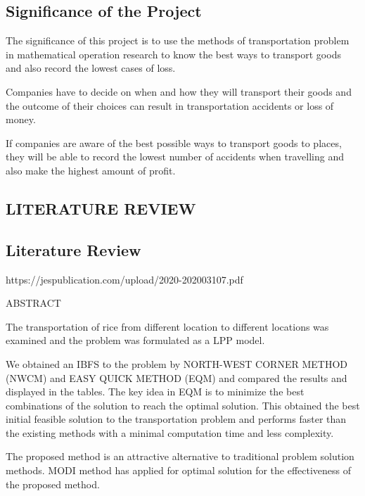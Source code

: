 \documentclass{article}
\begin{document}
\newpage

\begin{center}
\subsection{Significance of the Project}
\end{center}

The significance of this project is to use the methods of transportation problem in mathematical operation research to know the best ways to transport goods and also record the lowest cases of loss.

Companies have to decide on when and how they will transport their goods and the outcome of their choices can result in transportation accidents or loss of money. 

If companies are aware of the best possible ways to transport goods to places, they will be able to record the lowest number of accidents when travelling and also make the highest amount of profit.

\newpage

\begin{center}
	\section{LITERATURE REVIEW}
\end{center}
\subsection{Literature Review}

https://jespublication.com/upload/2020-202003107.pdf

ABSTRACT

The transportation of rice from different location to different locations was examined and the problem was formulated as a LPP model.

We obtained an IBFS to the problem by NORTH-WEST
CORNER METHOD (NWCM) and EASY
QUICK METHOD (EQM) and compared
the results and displayed in the tables. The
key idea in EQM is to minimize the best
combinations of the solution to reach the
optimal solution. This obtained the
best initial feasible solution to the
transportation problem and performs faster
than the existing methods with a minimal
computation time and less complexity.

The proposed method is an attractive
alternative to traditional problem solution
methods. MODI method has applied for optimal solution for
the effectiveness of the proposed method.
\end{document}
